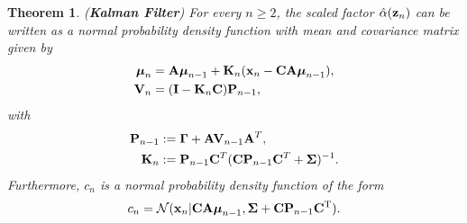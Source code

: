 \documentclass[11pt]{article}
\numberwithin{equation}{section}
\newcommand{\x}{{\bf x}}
\newcommand{\z}{{\bf z}}
\newcommand{\N}{\mathcal{N}}
\newtheorem{theorem}{Theorem}[section]
\begin{document}
\begin{theorem} \label{thorem:alpha-forward-equations-n}
	(\textbf{Kalman Filter}) For every $n \geq 2$, the scaled factor $\hat\alpha(\z_n)$ can be written as a normal probability density function with mean and covariance matrix given by
	\begin{align}
		\boldsymbol{\mu}_n &= {\bf A}\boldsymbol{\mu}_{n-1} + {\bf K}_n(\x_n -{\bf C}{\bf A}\boldsymbol\mu_{n-1}),\\
		{\bf V}_n &=  ({\bf I} - {\bf K}_n{\bf C}){\bf P}_{n-1}, \label{eq:Vn-Kalman-filter}
	\end{align}	
	with
	\begin{align}
		{\bf P}_{n-1} &:= \boldsymbol{\Gamma} + {\bf A}{\bf V}_{n-1}{\bf A}^T,\\
		{\bf K}_n &:= {\bf P}_{n-1}{\bf C}^T({\bf C} {\bf P}_{n-1}{\bf C}^T + \boldsymbol\Sigma)^{-1}.
	\end{align}
	Furthermore, $c_n$ is a normal probability density function of the form
	\begin{equation}
		c_n = \N(\x_n \vert {\bf CA}\boldsymbol\mu_{n-1}, \boldsymbol\Sigma + {\bf C P}_{n-1}{\bf C}^\text{T}).
	\end{equation}
\end{theorem}
\end{document}
